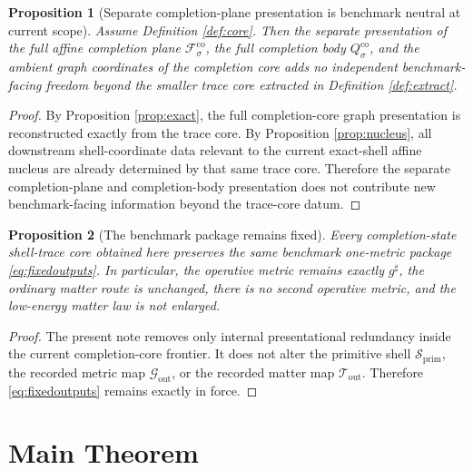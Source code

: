 \documentclass[11pt]{article}
\newcommand{\CompletedMetric}{g^{\sharp}}
\newcommand{\PrimShell}{\mathcal S_{\mathrm{prim}}}
\newcommand{\MetricOut}{\mathscr G_{\mathrm{out}}}
\newcommand{\MatterOut}{\mathscr T_{\mathrm{out}}}
\newcommand{\CoreAffine}[1]{\mathcal F_{#1}^{\mathrm{co}}}
\newcommand{\CoreBody}[1]{Q_{#1}^{\mathrm{co}}}
\newtheorem{proposition}{Proposition}
\begin{document}
\begin{proposition}[Separate completion-plane presentation is benchmark neutral at current scope]
\label{prop:neutral}
Assume Definition \ref{def:core}. Then the separate presentation of the full affine completion plane \(\CoreAffine{\sigma}\), the full completion body \(\CoreBody{\sigma}\), and the ambient graph coordinates of the completion core adds no independent benchmark-facing freedom beyond the smaller trace core extracted in Definition \ref{def:extract}.
\end{proposition}

\begin{proof}
By Proposition \ref{prop:exact}, the full completion-core graph presentation is reconstructed exactly from the trace core. By Proposition \ref{prop:nucleus}, all downstream shell-coordinate data relevant to the current exact-shell affine nucleus are already determined by that same trace core. Therefore the separate completion-plane and completion-body presentation does not contribute new benchmark-facing information beyond the trace-core datum.
\end{proof}

\begin{proposition}[The benchmark package remains fixed]
\label{prop:benchmark}
Every completion-state shell-trace core obtained here preserves the same benchmark one-metric package \eqref{eq:fixedoutputs}. In particular, the operative metric remains exactly \(\CompletedMetric\), the ordinary matter route is unchanged, there is no second operative metric, and the low-energy matter law is not enlarged.
\end{proposition}

\begin{proof}
The present note removes only internal presentational redundancy inside the current completion-core frontier. It does not alter the primitive shell \(\PrimShell\), the recorded metric map \(\MetricOut\), or the recorded matter map \(\MatterOut\). Therefore \eqref{eq:fixedoutputs} remains exactly in force.
\end{proof}

\section{Main Theorem}
\end{document}
